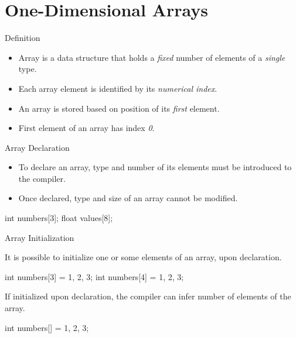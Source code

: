 \documentclass[compress]{beamer}
\begin{document}
\prepareCover

\section{One-Dimensional Arrays}

\begin{slide}
	\begin{block}{Definition}

	\begin{itemize}
	\item[] Array is a data structure that holds a \emph{fixed} number of elements of a \emph{single} type.
	\item[] Each array element is identified by its \emph{numerical index}.
	\item[] An array is stored based on position of its \emph{first} element.
	\item[] First element of an array has index \emph{0}.
	\end{itemize}

	\end{block}
\end{slide}

\begin{slide}
	\begin{block}{Array Declaration}

	\begin{itemize}
	\item[] To declare an array, type and number of its elements must be introduced to the compiler.
	\item[] Once declared, type and size of an array cannot be modified.
	\end{itemize}

	\begin{terminal}
	int numbers[3];
	float values[8];
	\end{terminal}

	\end{block}
\end{slide}

\begin{slide}
	\begin{block}{Array Initialization}

	It is possible to initialize one or some elements of an array, upon declaration.

	\begin{terminal}
	int numbers[3] = {1, 2, 3};
	int numbers[4] = {1, 2, 3};
	\end{terminal}

	If initialized upon declaration, the compiler can infer number of elements of the array.

	\begin{terminal}
	int numbers[] = {1, 2, 3};
	\end{terminal}

	\end{block}
\end{slide}
\end{document}
